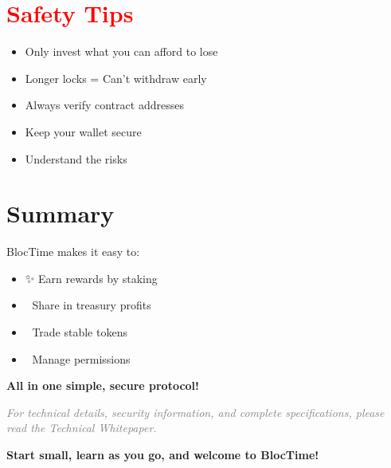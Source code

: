 \documentclass[12pt,a4paper]{article}
\begin{document}
\vspace{0.5cm}

\section*{\textcolor{red}{Safety Tips}}

\begin{itemize}
    \item[$\triangleright$] Only invest what you can afford to lose
    \item[$\triangleright$] Longer locks = Can't withdraw early
    \item[$\triangleright$] Always verify contract addresses
    \item[$\triangleright$] Keep your wallet secure
    \item[$\triangleright$] Understand the risks
\end{itemize}

\vspace{0.5cm}

\section*{\textcolor{maincolor}{Summary}}

BlocTime makes it easy to:
\begin{itemize}
    \item ✨ Earn rewards by staking
    \item 💎 Share in treasury profits
    \item 🔄 Trade stable tokens
    \item 🔐 Manage permissions
\end{itemize}

\textbf{All in one simple, secure protocol!}

\vspace{1cm}

\begin{center}
\textit{\textcolor{gray}{For technical details, security information, and complete specifications, please read the Technical Whitepaper.}}

\vspace{0.5cm}

\textbf{\textcolor{maincolor}{Start small, learn as you go, and welcome to BlocTime!}} 🎉
\end{center}
\end{document}
